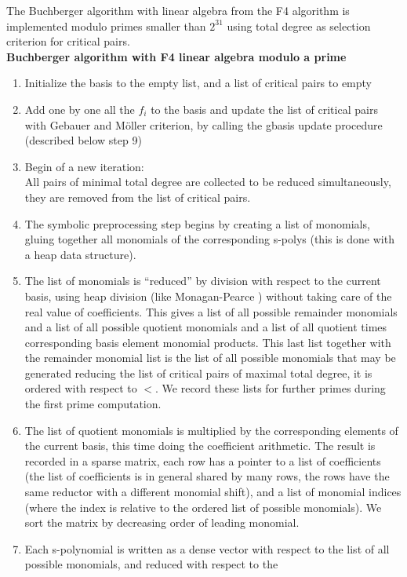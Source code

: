 \documentclass[a4paper,11pt]{book}
\begin{document}
\begin{giacjshere}
The Buchberger algorithm with linear algebra 
from the F4 algorithm is implemented modulo primes smaller than $2^{31}$
using total degree as selection criterion for critical pairs.\\
{\bf Buchberger algorithm with F4 linear algebra modulo a prime}
\begin{enumerate}
\item Initialize the basis to the empty list, and a list of critical
  pairs to empty
\item Add one by one all the $f_i$ to the basis and update
the list of critical pairs with Gebauer and M\"oller criterion, 
by calling the gbasis update procedure (described below step 9)
\item Begin of a new iteration:\\
All pairs of minimal total degree are
collected to be reduced simultaneously, they are removed from
the list of critical pairs.
\item The symbolic preprocessing step begins by creating 
a list of monomials, gluing
together all monomials of the corresponding s-polys (this
is done with a heap data structure). 
\item The list of monomials is ``reduced'' by division with respect 
to the current basis,
using heap division (like Monagan-Pearce \cite{monagan2011sparse}) 
without taking care
of the real value of coefficients. This gives a list of all possible remainder
monomials and a list of all possible quotient monomials and a list
of all quotient times corresponding basis element monomial products.
This last list together with the remainder monomial list is the
list of all possible monomials that may be generated reducing
the list of critical pairs of maximal total degree, 
it is ordered with respect to $<$. We
record these lists for further primes during the first prime computation.
\item The list
of quotient monomials is multiplied by the corresponding elements of the current
basis, this time doing the coefficient arithmetic.
The result is recorded in a sparse matrix, each row has a pointer
to a list of coefficients (the list of coefficients 
is in general shared by many rows, the rows have the
same reductor with a different monomial shift), 
and a list of monomial indices (where the index 
is relative to the ordered list of possible monomials). We sort
the matrix by decreasing order of leading monomial.
\item
Each s-polynomial is written as a dense vector with respect to the
list of all possible monomials, and reduced with respect to the

\end{enumerate}
\end{giacjshere}
\end{document}
